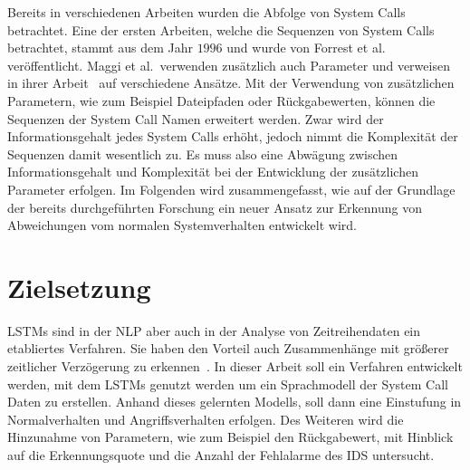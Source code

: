 Bereits in verschiedenen Arbeiten wurden die Abfolge von System Calls betrachtet.
Eine der ersten Arbeiten, welche die Sequenzen von System Calls betrachtet, stammt aus dem Jahr $1996$ und wurde von Forrest et al.~\cite{FORREST} veröffentlicht.
Maggi et al.\ verwenden zusätzlich auch Parameter und verweisen in ihrer Arbeit~\cite{MAGGI} auf verschiedene Ansätze.
Mit der Verwendung von zusätzlichen Parametern, wie zum Beispiel Dateipfaden oder Rückgabewerten, können die Sequenzen der System Call Namen erweitert werden.
Zwar wird der Informationsgehalt jedes System Calls erhöht, jedoch nimmt die Komplexität der Sequenzen damit wesentlich zu. 
Es muss also eine Abwägung zwischen Informationsgehalt und Komplexität bei der Entwicklung der zusätzlichen Parameter erfolgen.
Im Folgenden wird zusammengefasst, wie auf der Grundlage der bereits durchgeführten Forschung ein neuer Ansatz zur Erkennung von Abweichungen vom normalen Systemverhalten entwickelt wird.





\section{Zielsetzung}\label{sec:Forschungsfrage}

\acfp{LSTM} sind in der \ac{NLP} aber auch in der Analyse von Zeitreihendaten ein etabliertes Verfahren.
Sie haben den Vorteil auch Zusammenhänge mit größerer zeitlicher Verzögerung zu erkennen~\cite{HOCHREITER}.
In dieser Arbeit soll ein Verfahren entwickelt werden, mit dem \acp{LSTM} genutzt werden um ein Sprachmodell der System Call Daten zu erstellen.
Anhand dieses gelernten Modells, soll dann eine Einstufung in Normalverhalten und Angriffsverhalten erfolgen.
Des Weiteren wird die Hinzunahme von Parametern, wie zum Beispiel den Rückgabewert, mit Hinblick auf die Erkennungsquote und die Anzahl der Fehlalarme des \acf{IDS} untersucht.

